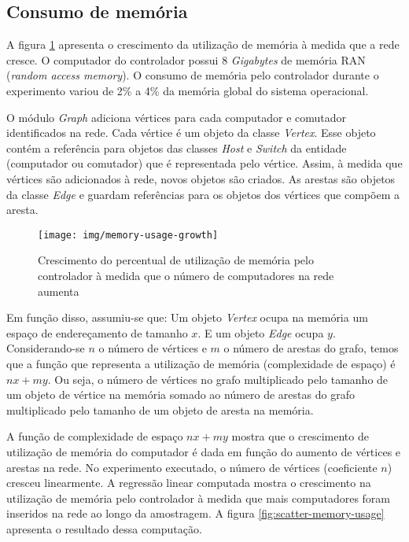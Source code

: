 \subsection{Consumo de memória}

A figura \ref{fig:memory-usage-growth} apresenta o crescimento da utilização
de memória à medida que a rede cresce.
O computador do controlador possui 8 \emph{Gigabytes} de memória RAN
(\emph{random access memory}).
O consumo de memória pelo controlador durante o experimento variou de 2\% a 4\%
da memória global do sistema operacional.

O módulo \emph{Graph} adiciona vértices para cada computador e comutador
identificados na rede.
Cada vértice é um objeto da classe \emph{Vertex}.
Esse objeto contém a referência para objetos das classes \emph{Host} e
\emph{Switch} da entidade (computador ou comutador) que é representada pelo
vértice.
Assim, à medida que vértices são adicionados à rede, novos objetos são
criados.
As arestas são objetos da classe \emph{Edge} e guardam referências para
os objetos dos vértices que compõem a aresta.

\break
\begin{figure}[!htb]
    \centering
    \label{fig:memory-usage-growth}
    \texttt{[image: img/memory-usage-growth]}
    \caption{Crescimento do percentual de utilização de memória pelo
    controlador à medida que o número de computadores na rede aumenta}
\end{figure}

Em função disso, assumiu-se que: Um objeto \emph{Vertex} ocupa na memória um
espaço de endereçamento de tamanho $x$.
E um objeto \emph{Edge} ocupa $y$.
Considerando-se $n$ o número de vértices e $m$ o número de arestas do grafo,
temos que a função que representa a utilização de memória (complexidade de
espaço) é $nx + my$.
Ou seja, o número de vértices no grafo multiplicado pelo tamanho de um
objeto de vértice na memória somado ao número de arestas do grafo
multiplicado pelo tamanho de um objeto de aresta na memória.


A função de complexidade de espaço $nx + my$ mostra que o crescimento de
utilização de memória do computador é dada em função do aumento de vértices
e arestas na rede.
No experimento executado, o número de vértices (coeficiente $n$) cresceu
linearmente.
A regressão linear computada mostra o crescimento na utilização de memória
pelo controlador à medida que mais computadores foram inseridos na rede ao
longo da amostragem.
A figura \ref{fig:scatter-memory-usage} apresenta o resultado dessa
computação.

